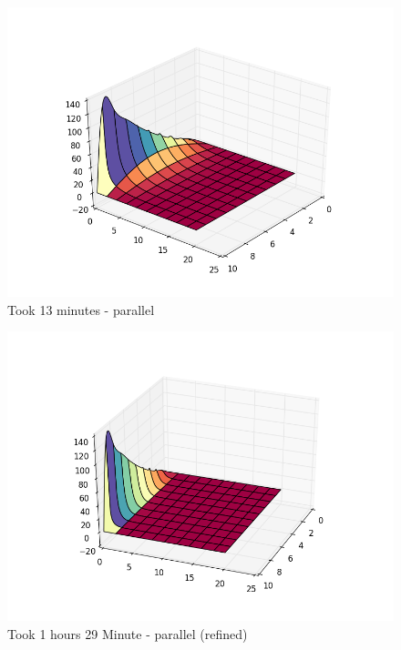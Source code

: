 \documentclass{sig-alternate}
\begin{document}
\begin{figure}[h!]
    \includegraphics[scale=.5]{hhheat1}
    \caption{Took 13 minutes - parallel} 
\end{figure}

\begin{figure}[h!]
   \includegraphics[scale=.5]{heat50} 
   \caption{Took 1 hours 29 Minute - parallel (refined)}
\end{figure}
\end{document}
